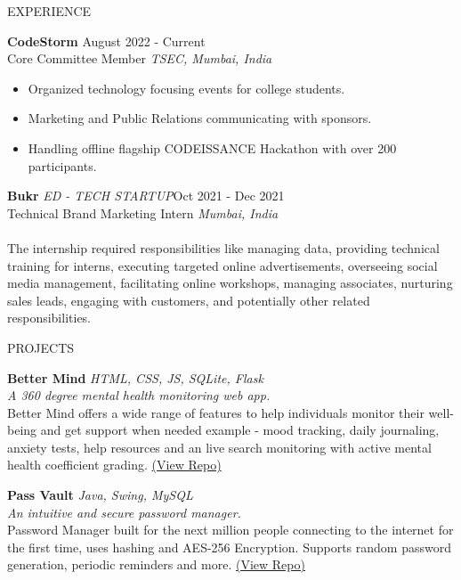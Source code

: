 \documentclass{resume} %
\begin{document}
\begin{rSection}{EXPERIENCE}

\textbf{CodeStorm} \hfill August 2022 - Current\\
Core Committee Member \hfill \textit{TSEC, Mumbai, India}
 \begin{itemize}
    \itemsep -3pt {} 
     \item Organized technology focusing events for college students.
     \item Marketing and Public Relations communicating with sponsors.\item Handling offline flagship CODEISSANCE Hackathon with over 200 participants.
 \end{itemize}

 
\textbf{Bukr} \textit{ED - TECH STARTUP}\hfill Oct 2021 - Dec 2021\\
Technical Brand Marketing Intern \hfill \textit{Mumbai, India}
\\ \\ The internship required responsibilities like managing data, providing technical training for interns, executing targeted online advertisements, overseeing social media management, facilitating online workshops, managing associates, nurturing sales leads, engaging with customers, and potentially other related responsibilities.





\end{rSection} 


\begin{rSection}{PROJECTS}
\vspace{-1.25em}
\item \textbf{Better Mind} {\hfill \textit{HTML, CSS, JS, SQLite, Flask }}
{\\\textit{A 360 degree mental health monitoring web app.}\\ Better Mind offers a wide range of features to help individuals monitor their well-being and get support when needed example - mood tracking, daily journaling, anxiety tests, help resources and an live search monitoring with active mental health coefficient grading. \href{https://github.com/AyeshaNagdawala/bettermind}{(View Repo)}}
\item \textbf{Pass Vault} {\hfill \textit{Java, Swing, MySQL }}
{\\\textit{An intuitive and secure password manager.} \\ Password Manager built for the next million people connecting to the internet for the first time, uses hashing and AES-256 Encryption. Supports random password generation, periodic reminders and more. \href{https://github.com/AyeshaNagdawala/passvault/} {(View Repo)}}
\end{rSection} 
\end{document}
